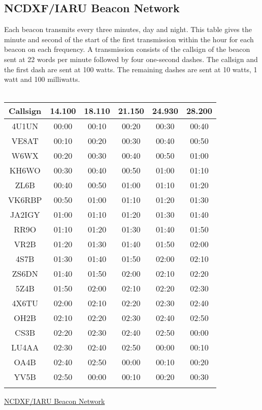 \documentclass[10pt]{article}
\begin{document}
\begin{multicols}{3}
\section{NCDXF/IARU Beacon Network}
\vspace{\baselineskip}
Each beacon transmits every three minutes, day and night. This table gives the minute and second of the start of the first transmission within the hour for each beacon on each frequency. A transmission consists of the callsign of the beacon sent at 22 words per minute followed by four one-second dashes. The callsign and the first dash are sent at 100 watts. The remaining dashes are sent at 10 watts, 1 watt and 100 milliwatts.\\
\\
\begin{tabular}{cccccc}
Callsign & 14.100 & 18.110 & 21.150 & 24.930 & 28.200 \\ \hline 
4U1UN    & 00:00 & 00:10 & 00:20 & 00:30 & 00:40 \\
VE8AT 	 & 00:10 & 00:20 & 00:30 & 00:40 & 00:50 \\
W6WX 	 & 00:20 & 00:30 & 00:40 & 00:50 & 01:00 \\
KH6WO 	 & 00:30 & 00:40 & 00:50 & 01:00 & 01:10 \\
ZL6B 	 & 00:40 & 00:50 & 01:00 & 01:10 & 01:20 \\
VK6RBP 	 & 00:50 & 01:00 & 01:10 & 01:20 & 01:30 \\
JA2IGY 	 & 01:00 & 01:10 & 01:20 & 01:30 & 01:40 \\
RR9O 	 & 01:10 & 01:20 & 01:30 & 01:40 & 01:50 \\
VR2B 	 & 01:20 & 01:30 & 01:40 & 01:50 & 02:00 \\
4S7B 	 & 01:30 & 01:40 & 01:50 & 02:00 & 02:10 \\
ZS6DN 	 & 01:40 & 01:50 & 02:00 & 02:10 & 02:20 \\
5Z4B 	 & 01:50 & 02:00 & 02:10 & 02:20 & 02:30 \\
4X6TU 	 & 02:00 & 02:10 & 02:20 & 02:30 & 02:40 \\
OH2B 	 & 02:10 & 02:20 & 02:30 & 02:40 & 02:50 \\
CS3B 	 & 02:20 & 02:30 & 02:40 & 02:50 & 00:00 \\
LU4AA 	 & 02:30 & 02:40 & 02:50 & 00:00 & 00:10 \\
OA4B 	 & 02:40 & 02:50 & 00:00 & 00:10 & 00:20 \\
YV5B 	 & 02:50 & 00:00 & 00:10 & 00:20 & 00:30 \\
         &       &       &       &       &       \\    
\end{tabular}
\href{http://www.ncdxf.org/beacon/intro.html}{NCDXF/IARU Beacon Network}


\end{multicols}
\end{document}
